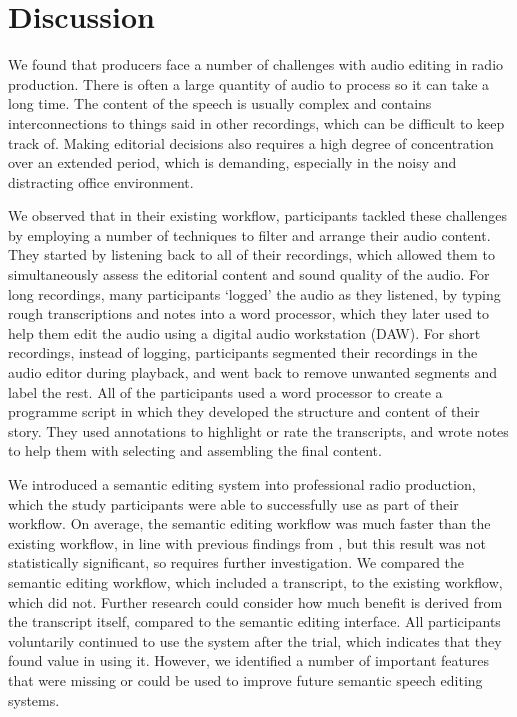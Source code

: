

\section{Discussion}\label{sec:discussion}
We found that producers face a number of challenges with audio editing in radio production. There is often a large
quantity of audio to process so it can take a long time. The content of the speech is usually complex and contains
interconnections to things said in other recordings, which can be difficult to keep track of. Making editorial
decisions also requires a high degree of concentration over an extended period, which is demanding, especially in the
noisy and distracting office environment.

We observed that in their existing workflow, participants tackled these challenges by employing a number of techniques
to filter and arrange their audio content. They started by listening back to all of their recordings, which allowed
them to simultaneously assess the editorial content and sound quality of the audio. For long recordings, many
participants `logged' the audio as they listened, by typing rough transcriptions and notes into a word processor, which
they later used to help them edit the audio using a digital audio workstation (DAW). For short recordings, instead of
logging, participants segmented their recordings in the audio editor during playback, and went back to remove unwanted
segments and label the rest.
All of the participants used a word processor to create a programme script in which they developed the structure and
content of their story. They used annotations to highlight or rate the transcripts, and wrote notes to help them with
selecting and assembling the final content.

We introduced a semantic editing system into professional radio production, which the study participants were able to
successfully use as part of their workflow. On average, the semantic editing workflow was much faster than the existing
workflow, in line with previous findings from \citet{Whittaker2004}, but this result was not statistically significant,
so requires further investigation.  We compared the semantic editing workflow, which included a transcript, to the
existing workflow, which did not. Further research could consider how much benefit is derived from the transcript
itself, compared to the semantic editing interface.  All participants voluntarily continued to use the system after the
trial, which indicates that they found value in using it. However, we identified a number of important features that
were missing or could be used to improve future semantic speech editing systems.

